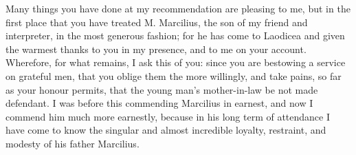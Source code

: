 

Many things you have done at my recommendation are pleasing to me, but in the first place that you have treated M. Marcilius, the son of my friend and interpreter, in the most generous fashion; for he has come to Laodicea and given the warmest thanks to you in my presence, and to me on your account. Wherefore, for what remains, I ask this of you: since you are bestowing a service on grateful men, that you oblige them the more willingly, and take pains, so far as your honour permits, that the young man's mother-in-law be not made defendant. I was before this commending Marcilius in earnest, and now I commend him much more earnestly, because in his long term of attendance I have come to know the singular and almost incredible loyalty, restraint, and modesty of his father Marcilius.
